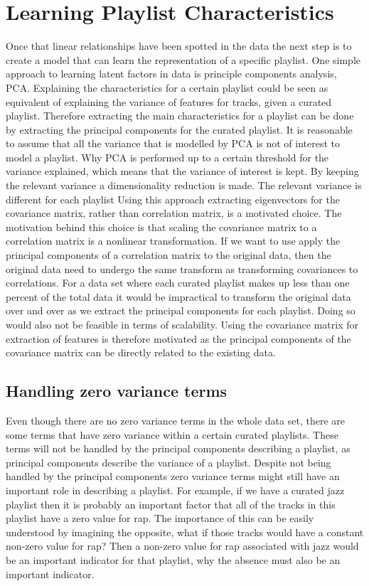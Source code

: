 \documentclass[a4paper,11pt]{kth-mag}
\begin{document}
\section{Learning Playlist Characteristics}
Once that linear relationships have been spotted in the data the next step is to create a model that can learn the representation of a specific playlist. One simple approach to learning latent factors in data is principle components analysis, PCA.
Explaining the characteristics for a certain playlist could be seen as equivalent of explaining the variance of features for tracks, given a curated playlist. Therefore extracting the main characteristics for a playlist can be done by extracting the principal components for the curated playlist. It is reasonable to assume that all the variance that is modelled by PCA is not of interest to model a playlist. Why PCA is performed up to a certain threshold for the variance explained, which means that the variance of interest is kept. By keeping the relevant variance a dimensionality reduction is made. The relevant variance is different for each playlist
Using this approach extracting eigenvectors for the covariance matrix, rather than correlation matrix, is a motivated choice. The motivation behind this choice is that scaling the covariance matrix to a correlation matrix is a nonlinear transformation. If we want to use apply the principal components of a correlation matrix to the original data, then the original data need to undergo the same transform as transforming covariances to correlations. For a data set where each curated playlist makes up less than one percent of the total data it would be impractical to transform the original data over and over as we extract the principal components for each playlist. Doing so would also not be feasible in terms of scalability. Using the covariance matrix for extraction of features is therefore motivated as the principal components of the covariance matrix can be directly related to the existing data.

\subsection{Handling zero variance terms}
Even though there are no zero variance terms in the whole data set, there are some terms that have zero variance within a certain curated playlists. These terms will not be handled by the principal components describing a playlist, as principal components describe the variance of a playlist. Despite not being handled by the principal components zero variance terms might still have an important role in describing a playlist. For example, if we have a curated jazz playlist then it is probably an important factor that all of the tracks in this playlist have a zero value for rap. The importance of this can be easily understood by imagining the opposite, what if those tracks would have a constant non-zero value for rap? Then a non-zero value for rap associated with jazz would be an important indicator for that playlist, why the absence must also be an important indicator.
\end{document}
